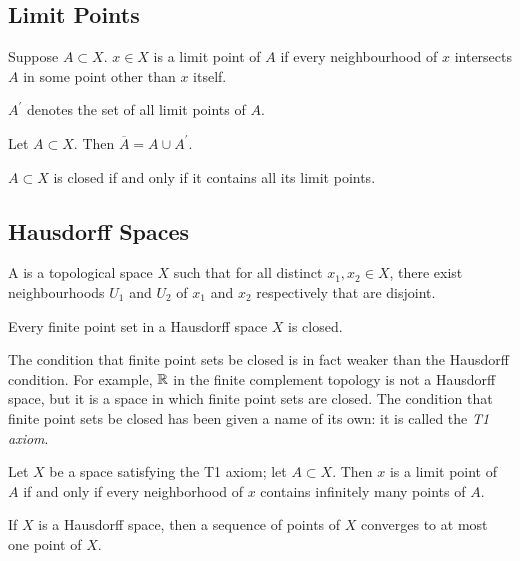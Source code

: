 \subsection{Limit Points}
\begin{definition}
Suppose $A\subset X$. $x\in X$ is a limit point of $A$ if every neighbourhood of $x$ intersects $A$ in some point other than $x$ itself.
\end{definition}

$A^\prime$ denotes the set of all limit points of $A$.

\begin{proposition}
Let $A\subset X$. Then $\overline{A}=A\cup A^\prime$.
\end{proposition}

\begin{corollary}
$A\subset X$ is closed if and only if it contains all its limit points.
\end{corollary}

\subsection{Hausdorff Spaces}
\begin{definition}
A  is a topological space $X$ such that for all distinct $x_1,x_2\in X$, there exist neighbourhoods $U_1$ and $U_2$ of $x_1$ and $x_2$ respectively that are disjoint.
\end{definition}

\begin{proposition}
Every finite point set in a Hausdorff space $X$ is closed.
\end{proposition}

The condition that finite point sets be closed is in fact weaker than the Hausdorff condition. For example, $\mathbb R$ in the finite complement topology is not a Hausdorff space, but it is a space in which finite point sets are closed. The condition that finite point sets be closed has been given a name of its own: it is called the \emph{T1 axiom}.

\begin{proposition}
Let $X$ be a space satisfying the T1 axiom; let $A\subset X$. Then $x$ is a limit point of $A$ if and only if every neighborhood of $x$ contains infinitely many points of $A$.
\end{proposition}

\begin{proposition}
If $X$ is a Hausdorff space, then a sequence of points of $X$ converges to at most one point of $X$.
\end{proposition}


